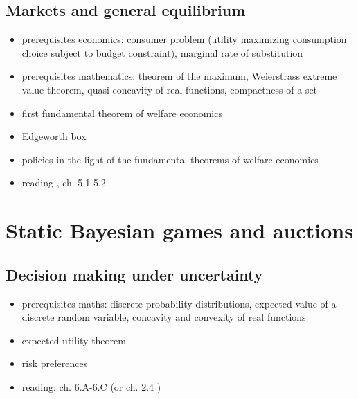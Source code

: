 \documentclass[11pt]{article}
\begin{document}
\subsection{Markets and general equilibrium}
\label{sec:org6422b5d}
\begin{itemize}
\item prerequisites economics: consumer problem (utility maximizing consumption choice subject to budget constraint), marginal rate of substitution
\item prerequisites mathematics:  theorem of the maximum, Weierstrass extreme value theorem, quasi-concavity of real functions, compactness of a set
\item first fundamental theorem of welfare economics
\item Edgeworth box
\item policies in the light of the fundamental theorems of welfare economics
\item reading \cite{hayek1945use}, \cite{jehle2001advanced} ch. 5.1-5.2
\end{itemize}

\section{Static Bayesian games and auctions}
\label{sec:orga18ec96}

\subsection{Decision making under uncertainty}
\label{sec:orgf730385}
\begin{itemize}
\item prerequisites maths: discrete probability distributions, expected value of a discrete random variable, concavity and convexity of real functions
\item expected utility theorem
\item risk preferences
\item reading: \cite{mas1995microeconomic} ch. 6.A-6.C (or \cite{jehle2001advanced} ch. 2.4 )
\end{itemize}
\end{document}
